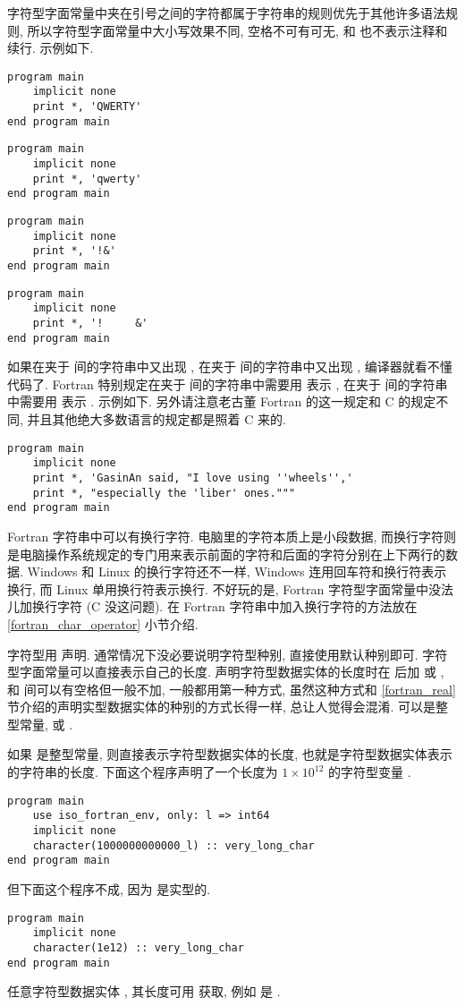 字符型字面常量中夹在引号之间的字符都属于字符串的规则优先于其他许多语法规则, 所以字符型字面常量中大小写效果不同, 空格不可有可无, \ttt{!} 和 \ttt{\&{}} 也不表示注释和续行. 示例如下.
\begin{lstlisting}
program main
    implicit none
    print *, 'QWERTY'
end program main
\end{lstlisting}
\begin{lstlisting}
program main
    implicit none
    print *, 'qwerty'
end program main
\end{lstlisting}
\begin{lstlisting}
program main
    implicit none
    print *, '!&' 
end program main
\end{lstlisting}
\begin{lstlisting}
program main
    implicit none
    print *, '!     &' 
end program main
\end{lstlisting}

如果在夹于  间的字符串中又出现 , 在夹于  间的字符串中又出现 , 编译器就看不懂代码了. Fortran 特别规定在夹于  间的字符串中需要用  表示 , 在夹于  间的字符串中需要用  表示 . 示例如下. 另外请注意老古董 Fortran 的这一规定和 C 的规定不同, 并且其他绝大多数语言的规定都是照着 C 来的.
\begin{lstlisting}
program main
    implicit none
    print *, 'GasinAn said, "I love using ''wheels'','
    print *, "especially the 'liber' ones."""
end program main
\end{lstlisting}

Fortran 字符串中可以有换行字符. 电脑里的字符本质上是小段数据, 而换行字符则是电脑操作系统规定的专门用来表示前面的字符和后面的字符分别在上下两行的数据. Windows 和 Linux 的换行字符还不一样, Windows 连用回车符和换行符表示换行, 而 Linux 单用换行符表示换行. 不好玩的是, Fortran 字符型字面常量中没法儿加换行字符 (C 没这问题). 在 Fortran 字符串中加入换行字符的方法放在 \ref{fortran_char_operator} 小节介绍.

字符型用  声明. 通常情况下没必要说明字符型种别, 直接使用默认种别即可. 字符型字面常量可以直接表示自己的长度. 声明字符型数据实体的长度时在  后加 \ttt{([len])} 或 , 和  间可以有空格但一般不加, 一般都用第一种方式, 虽然这种方式和 \ref{fortran_real} 节介绍的声明实型数据实体的种别的方式长得一样, 总让人觉得会混淆. \ttt{[len]} 可以是整型常量, \ttt{*} 或 \ttt{:}.

如果 \ttt{[len]} 是整型常量, 则直接表示字符型数据实体的长度, 也就是字符型数据实体表示的字符串的长度. 下面这个程序声明了一个长度为 $1\times 10^{12}$ 的字符型变量 .
\begin{lstlisting}
program main
    use iso_fortran_env, only: l => int64
    implicit none
    character(1000000000000_l) :: very_long_char
end program main
\end{lstlisting}
但下面这个程序不成, 因为  是实型的.
\begin{lstlisting}
program main
    implicit none
    character(1e12) :: very_long_char
end program main
\end{lstlisting}
任意字符型数据实体 \ttt{[c]}, 其长度可用  获取, 例如  是 .

